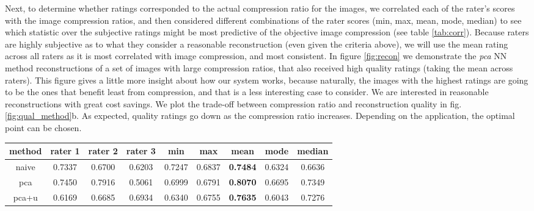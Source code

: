 Next, to determine whether ratings corresponded to the actual compression ratio for the images, we correlated each of the rater's scores with the image compression ratios, and then considered different combinations of the rater scores (min, max, mean, mode, median) to see which statistic over the subjective ratings might be most predictive of the objective image compression (see table \ref{tab:corr}). Because raters are highly subjective as to what they consider a reasonable reconstruction (even given the criteria above), we will use the mean rating across all raters as it is most correlated with image compression, and most consistent. In figure \ref{fig:recon} we demonstrate the \emph{pca} NN method reconstructions of a set of images with large compression ratios, that also received high quality ratings (taking the mean across raters). This figure gives a little more insight about how our system works, because naturally, the images with the highest ratings are going to be the ones that benefit least from compression, and that is a less interesting case to consider. We are interested in reasonable reconstructions with great cost savings. We plot the trade-off between compression ratio and reconstruction quality in fig. \ref{fig:qual_method}b. As expected, quality ratings go down as the compression ratio increases. Depending on the application, the optimal point can be chosen.

\begin{table*}
\centering
\begin{tabular}{|c|c|c|c|c|c|c|c|c|}
 \hline
\textbf{method} & \textbf{rater 1} & \textbf{rater 2} & \textbf{rater 3}  & \textbf{min} & \textbf{max} & \textbf{mean} & \textbf{mode} & \textbf{median}\\ \hline
naive & 0.7337 & 0.6700 & 0.6203  & 0.7247 & 0.6837 & \textbf{0.7484} & 0.6324 & 0.6636 \\ \hline
pca & 0.7450 & 0.7916 & 0.5061 & 0.6999 & 0.6791 &  \textbf{0.8070} & 0.6695 & 0.7349 \\ \hline
pca+u & 0.6169 & 0.6685 & 0.6934 & 0.6340 & 0.6755 &  \textbf{0.7635} & 0.6043 & 0.7276  \\ \hline
\end{tabular}
\caption{Here we determine what function of rater scores is most predictive of image compression ratios. We see that the mean across the rater scores has the highest correlation with image compression, presumably because it filters out the noise inherent in subjective judgements.}
\label{tab:corr}
\end{table*}

